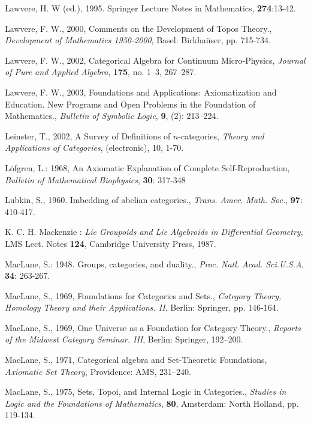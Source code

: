 \documentclass[12pt]{article}
\theoremstyle{plain}
\theoremstyle{definition}
\numberwithin{equation}{section}
\begin{document}
\begin{thebibliography}{9}
Lawvere, H. W (ed.), 1995. Springer Lecture Notes in Mathematics, \textbf{274}:13-42. 

Lawvere, F. W., 2000, Comments on the Development of Topos Theory., {\em Development of Mathematics 1950-2000}, Basel: Birkha\"user, pp. 715-734. 

Lawvere, F. W., 2002, Categorical Algebra for Continuum Micro-Physics, {\em Journal of Pure and Applied Algebra}, \textbf {175}, no. 1--3, 267--287. 

Lawvere, F. W., 2003, Foundations and Applications: Axiomatization and Education. New Programs and Open Problems in the Foundation of Mathematics., {\em Bulletin of Symbolic Logic}, \textbf{9}, (2): 213--224. 

Leinster, T., 2002, A Survey of Definitions of $n$-categories, {\em Theory and Applications of Categories}, (electronic), 10, 1-70. 

L\"{o}fgren, L.: 1968, An Axiomatic Explanation of Complete Self-Reproduction, \emph{Bulletin of Mathematical Biophysics}, \textbf{30}: 317-348

Lubkin, S., 1960. Imbedding of abelian categories.,  {\em Trans. Amer. Math. Soc.}, \textbf{97}: 410-417.

K. C. H. Mackenzie : \emph{Lie Groupoids and Lie Algebroids in Differential Geometry}, LMS Lect. Notes \textbf{124}, Cambridge University Press, 1987.

MacLane, S.: 1948. Groups, categories, and duality., {\em Proc. Natl. Acad. Sci.U.S.A},
\textbf{34}: 263-267.

MacLane, S., 1969, Foundations for Categories and Sets., {\em Category Theory, Homology Theory and their Applications. II}, Berlin: Springer, pp. 146-164. 

MacLane, S., 1969, One Universe as a Foundation for Category Theory., {\em Reports of the Midwest Category Seminar. III}, Berlin: Springer, 192--200. 

MacLane, S., 1971, Categorical algebra and Set-Theoretic Foundations, {\em Axiomatic Set Theory}, Providence: AMS, 231--240. 

MacLane, S., 1975, Sets, Topoi, and Internal Logic in Categories., {\em Studies in Logic and the Foundations of Mathematics}, \textbf{80}, Amsterdam: North Holland, pp. 119-134. 


\end{thebibliography}
\end{document}
